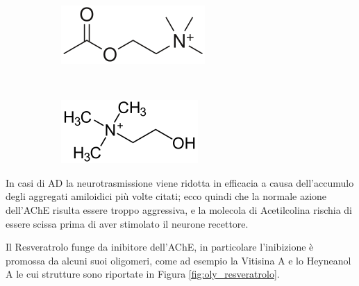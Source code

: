 \documentclass[a4paper, 12pt]{article}
\begin{document}
\begin{figure}[H]
	\centering
	\begin{subfigure}[b]{0.3\linewidth}
		\includegraphics[width=\linewidth]{immagini/acetilcolina.png}
	\end{subfigure}
	~
	\begin{subfigure}[b]{0.3\linewidth}
		\includegraphics[width=\linewidth]{immagini/colina.png}
	\end{subfigure}
	\label{fig:coline}
\end{figure}

In casi di AD la neurotrasmissione viene ridotta in efficacia a causa dell'accumulo degli aggregati amiloidici più volte citati; ecco quindi che la normale azione dell'AChE risulta essere troppo aggressiva, e la molecola di Acetilcolina rischia di essere scissa prima di aver stimolato il neurone recettore.

Il Resveratrolo funge da inibitore dell'AChE, in particolare l'inibizione è promossa da alcuni suoi oligomeri, come ad esempio la Vitisina A e lo Heyneanol A le cui strutture sono riportate in Figura \ref{fig:oly_resveratrolo}.
\end{document}
